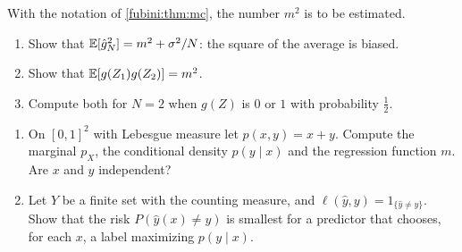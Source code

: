 \begin{notechapter}
\begin{exercise}\label{fubini:exr:8}
With the notation of \cref{fubini:thm:mc}, the number $m^2$ is to be
estimated.
\begin{enumerate}[nosep]
  \item Show that $\mathbb{E}[\hat g_N^2] = m^2 + \sigma^2/N$: the square of the
        average is biased.
  \item Show that $\mathbb{E}[g(Z_1)g(Z_2)] = m^2$.
  \item Compute both for $N = 2$ when $g(Z)$ is $0$ or $1$ with
        probability $\frac12$.
\end{enumerate}
\end{exercise}

\begin{exercise}\label{fubini:exr:9}
\begin{enumerate}[nosep]
  \item On $[0, 1]^2$ with Lebesgue measure let $p(x, y) = x + y$.
        Compute the marginal $p_X$, the conditional density
        $p(y\mid x)$ and the regression function $m$. Are $x$ and $y$
        independent?
  \item Let $Y$ be a finite set with the counting measure, and
        $\ell(\hat y, y) = 1_{\{\hat y\neq y\}}$. Show that the risk
        $P(\hat y(x)\neq y)$ is smallest for a predictor that chooses,
        for each $x$, a label maximizing $p(y\mid x)$.
\end{enumerate}
\end{exercise}
\end{notechapter}
